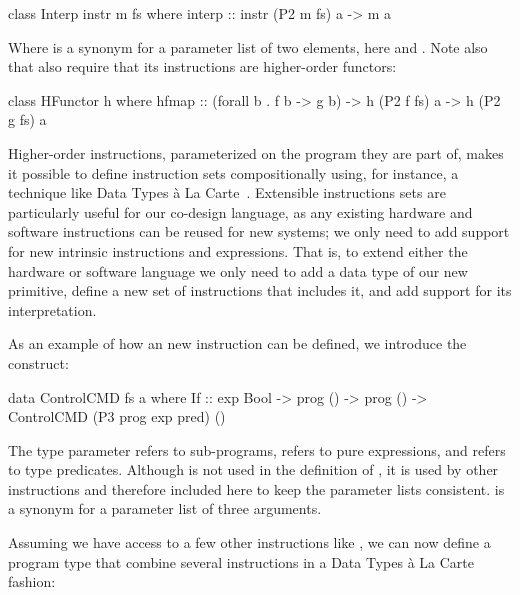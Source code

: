 \documentclass[../paper.tex]{subfiles}
\begin{document}
\begin{code}
class Interp instr m fs where
  interp :: instr (P2 m fs) a -> m a
\end{code}

\noindent Where  is a synonym for a parameter list of two elements, here  and . Note also that  also require that its instructions are higher-order functors:

\begin{code}
class HFunctor h where
  hfmap :: (forall b . f b -> g b) -> h (P2 f fs) a -> h (P2 g fs) a
\end{code}

Higher-order instructions, parameterized on the program they are part of, makes it possible to define instruction sets compositionally using, for instance, a technique like Data Types \`{a} La Carte~\cite{DTC}. Extensible instructions sets are particularly useful for our co-design language, as any existing hardware and software instructions can be reused for new systems; we only need to add support for new intrinsic instructions and expressions. That is, to extend either the hardware or software language we only need to add a data type of our new primitive, define a new set of instructions that includes it, and add support for its interpretation. 


As an example of how an new instruction can be defined, we introduce the  construct:

\begin{code}
data ControlCMD fs a where
  If :: exp Bool -> prog () -> prog () -> ControlCMD (P3 prog exp pred) ()
\end{code}

\noindent The type parameter  refers to sub-programs,  refers to pure expressions, and  refers to type predicates. Although  is not used in the definition of , it is used by other instructions and therefore included here to keep the parameter lists consistent.  is a synonym for a parameter list of three arguments.

Assuming we have access to a few other instructions like , we can now define a program type that combine several instructions in a Data Types \`{a} La Carte fashion:
\end{document}
